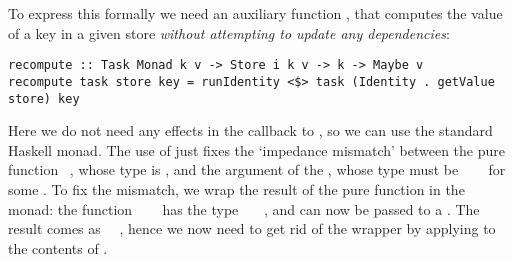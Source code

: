 To express this formally we need an auxiliary
function , that computes the value of a key in a given store
\emph{without attempting to update any dependencies}:
\begin{verbatim}
recompute :: Task Monad k v -> Store i k v -> k -> Maybe v
recompute task store key = runIdentity <$> task (Identity . getValue store) key
\end{verbatim}
\noindent
{}
Here we do not need any effects in the  callback to , so
we can use the standard Haskell  monad.
The use of  just fixes the `impedance mismatch'
between the pure function ~, whose type is \store, and
the  argument of the , whose type must be
~\hs{->}~~ for some . To fix the mismatch, we wrap the
result of the pure function in the  monad: the function
~~~ has the type
~\hs{->}~~, and can now be passed to a . The
result comes as ~~, hence we now need to get rid
of the  wrapper by applying  to the contents of
.

